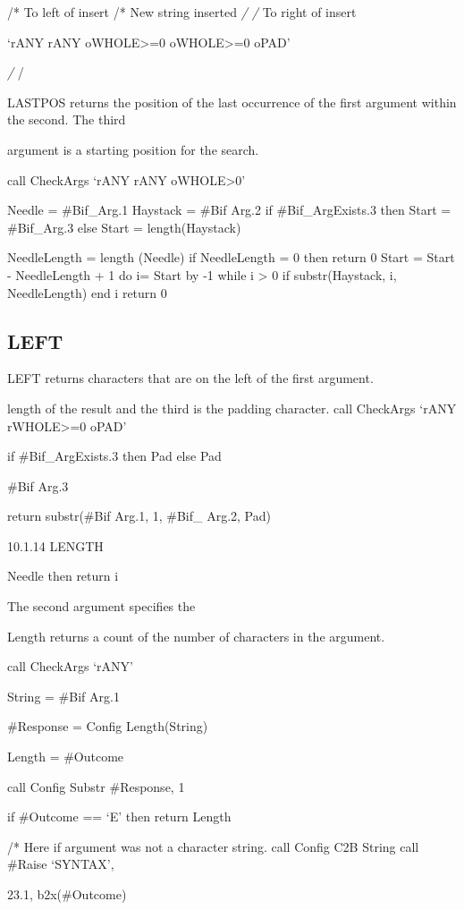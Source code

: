/* To left of insert /* New string inserted \emph{/ /} To right of
insert

`rANY rANY oWHOLE\textgreater=0 oWHOLE\textgreater=0 oPAD'

\emph{/ }/

LASTPOS returns the position of the last occurrence of the first
argument within the second. The third

argument is a starting position for the search.

call CheckArgs `rANY rANY oWHOLE\textgreater0'

Needle = \#Bif\_Arg.1 Haystack = \#Bif Arg.2 if \#Bif\_ArgExists.3 then
Start = \#Bif\_Arg.3 else Start = length(Haystack)

NeedleLength = length (Needle) if NeedleLength = 0 then return 0 Start =
Start - NeedleLength + 1 do i= Start by -1 while i \textgreater{} 0 if
substr(Haystack, i, NeedleLength) end i return 0

\hypertarget{left}{%
\subsection{LEFT}\label{left}}

LEFT returns characters that are on the left of the first argument.

length of the result and the third is the padding character. call
CheckArgs `rANY rWHOLE\textgreater=0 oPAD'

if \#Bif\_ArgExists.3 then Pad else Pad

\#Bif Arg.3

return substr(\#Bif Arg.1, 1, \#Bif\_ Arg.2, Pad)

10.1.14 LENGTH

Needle then return i

The second argument specifies the

Length returns a count of the number of characters in the argument.

call CheckArgs `rANY'

String = \#Bif Arg.1

\#Response = Config Length(String)

Length = \#Outcome

call Config Substr \#Response, 1

if \#Outcome == `E' then return Length

/* Here if argument was not a character string. call Config C2B String
call \#Raise `SYNTAX',

23.1, b2x(\#Outcome)

